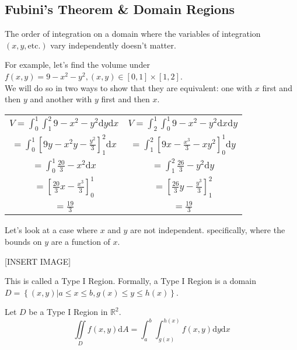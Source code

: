 \subsection{Fubini's Theorem \& Domain Regions}
\begin{theorem}
	The order of integration on a domain where the variables of integration $\left(x,y,\text{etc.}\right)$ vary independently doesn't matter.
\end{theorem}

\noindent
For example, let's find the volume under $f(x,y)=9-x^2-y^2, (x,y)\in[0,1]\times[1,2]$.\\
We will do so in two ways to show that they are equivalent: one with $x$ first and then $y$ and another with $y$ first and then $x$.\\
\begin{center}
	\begin{tabular}{c|c}
		$V=\int_{0}^{1}{\int_{1}^{2}{9-x^2-y^2\mathrm{d}y}\mathrm{d}x}$ & $V=\int_{2}^{1}{\int_{0}^{1}{9-x^2-y^2\mathrm{d}x}\mathrm{d}y}$ \\
		$=\int_{0}^{1}{\left[9y-x^2y-\frac{y^2}{3}\right]_{1}^{2}\mathrm{d}x}$ & $=\int_{1}^{2}{\left[9x-\frac{x^3}{3}-xy^2\right]_{0}^{1}\mathrm{d}y}$ \\
		$=\int_{0}^{1}{\frac{20}{3}-x^2\mathrm{d}x}$ & $=\int_{1}^{2}{\frac{26}{3}-y^2\mathrm{d}y}$ \\
		$=\left[\frac{20}{3}x-\frac{x^3}{3}\right]_{0}^{1}$ & $=\left[\frac{26}{3}y-\frac{y^3}{3}\right]_{1}^{2}$ \\
		$=\frac{19}{3}$ & $=\frac{19}{3}$ \\
	\end{tabular}
\end{center}

\noindent
Let's look at a case where $x$ and $y$ are not independent. specifically, where the bounds on $y$ are a function of $x$.

[INSERT IMAGE]

\noindent
This is called a Type I Region. Formally, a Type I Region is a domain $D=\left\{(x,y)|a\leq x\leq b, g(x)\leq y\leq h(x)\right\}$.\\

\begin{theorem}
	Let $D$ be a Type I Region in $\mathbb{R}^2$.\\
	$$\iint\limits_{D}{f(x,y)\mathrm{d}A}=\int_{a}^{b}{\int_{g(x)}^{h(x)}{f(x,y)\mathrm{d}y}\mathrm{d}x}$$
\end{theorem}

